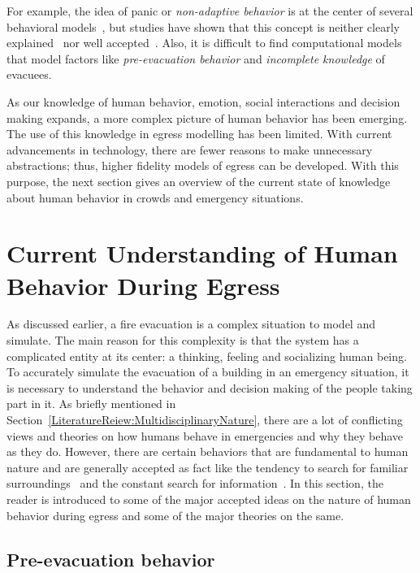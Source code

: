 For example, the idea of panic or \emph{non-adaptive behavior} is at the center of several behavioral models~\cite{Pan:2006vp,Franca:2009wq}, but studies have shown that this concept is neither clearly explained~\cite{Torres:2010tj} nor well accepted~\cite{Cocking:2005uc,Paulsen:1984ti,Proulx:2001we,Ramachandran:1990wj,Sandberg:1997tw,Sime:1995uu}. Also, it is difficult to find computational models that model factors like \emph{pre-evacuation behavior} and \emph{incomplete knowledge} of evacuees.

As our knowledge of human behavior, emotion, social interactions and decision making expands, a more complex picture of human behavior has been emerging. The use of this knowledge in egress modelling has been limited. With current advancements in technology, there are fewer reasons to make unnecessary abstractions; thus, higher fidelity models of egress can be developed. With this purpose, the next section gives an overview of the current state of knowledge about human behavior in crowds and emergency situations.

\section{Current Understanding of Human Behavior During Egress}
\label{LiteratureReview:CurrentUnderstanding}

As discussed earlier, a fire evacuation is a complex situation to model and simulate. The main reason for this complexity is that the system has a complicated entity at its center: a thinking, feeling and socializing human being. To accurately simulate the evacuation of a building in an emergency situation, it is necessary to understand the behavior and decision making of the people taking part in it. As briefly mentioned in Section~\ref{LiteratureReiew:MultidisciplinaryNature}, there are a lot of conflicting views and theories on how humans behave in emergencies and why they behave as they do. However,  there are certain behaviors that are fundamental to human nature and are generally accepted as fact like the tendency to search for familiar surroundings~\cite{Mawson:2005tq,Paulsen:1984ti,Ramachandran:1990wj,Sandberg:1997tw} and the constant search for information~\cite{Proulx:2003tc,Tong:1985wn,Ozel:2001tn,Sime:1983uy}. In this section, the reader is introduced to some of the major accepted ideas on the nature of human behavior during egress and some of the major theories on the same.

\subsection{Pre-evacuation behavior}
\label{LiteratureReview:HowItAllBegins}

